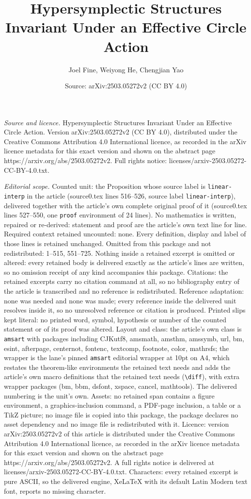\documentclass[10pt,a4paper]{amsart}
\title[Hypersymplectic Structures Invariant Under an Effective Circ]{Hypersymplectic Structures Invariant Under an Effective Circle Action}
\author{Joel Fine, Weiyong He, Chengjian Yao}
\date{Source: arXiv:2503.05272v2 (CC BY 4.0)}
\begin{document}
\maketitle

\noindent\emph{Source and licence.} Hypersymplectic Structures Invariant Under an Effective Circle Action. Version arXiv:2503.05272v2 (CC BY 4.0), distributed under the Creative Commons Attribution 4.0 International licence, as recorded in the arXiv licence metadata for this exact version and shown on the abstract page https://arxiv.org/abs/2503.05272v2. Full rights notice: licenses/arxiv-2503.05272-CC-BY-4.0.txt.\par\smallskip

\noindent\textit{Editorial scope.} Counted unit: the Proposition whose source label is \texttt{linear-interp} in the article (source0.tex lines 516--526, source label \texttt{linear-interp}), delivered together with the article's own complete original proof of it (source0.tex lines 527--550, one \texttt{proof} environment of 24 lines). No mathematics is written, repaired or re-derived: statement and proof are the article's own text line for line. Required context retained uncounted: none. Every definition, display and label of those lines is retained unchanged. Omitted from this package and not redistributed: 1--515, 551--725. Nothing inside a retained excerpt is omitted or altered: every retained body is delivered exactly as the article's lines are written, so no omission receipt of any kind accompanies this package. Citations: the retained excerpts carry no citation command at all, so no bibliography entry of the article is transcribed and no reference is redistributed. Reference adaptation: none was needed and none was made; every reference inside the delivered unit resolves inside it, so no unresolved reference or citation is produced. Printed slips kept literal: no printed word, symbol, hypothesis or number of the counted statement or of its proof was altered. Layout and class: the article's own class is \texttt{amsart} with packages including CJKutf8, amsmath, amsthm, amssymb, url, bm, esint, afterpage, centernot, fontenc, textcomp, footnote, color, mathrsfs; the wrapper is the lane's pinned \texttt{amsart} editorial wrapper at 10pt on A4, which restates the theorem-like environments the retained text needs and adds the article's own macro definitions that the retained text needs (\texttt{\textbackslash diff}), with extra wrapper packages (bm, bbm, dsfont, xspace, cancel, mathtools). The delivered numbering is the unit's own. Assets: no retained span contains a figure environment, a graphics-inclusion command, a PDF-page inclusion, a table or a TikZ picture; no image file is copied into this package, the package declares no asset dependency and no image file is redistributed with it. Licence: version arXiv:2503.05272v2 of this article is distributed under the Creative Commons Attribution 4.0 International licence, as recorded in the arXiv licence metadata for this exact version and shown on the abstract page https://arxiv.org/abs/2503.05272v2. A full rights notice is delivered at licenses/arxiv-2503.05272-CC-BY-4.0.txt. Characters: every retained excerpt is pure ASCII, so the delivered engine, XeLaTeX with its default Latin Modern text font, reports no missing character.
\end{document}
